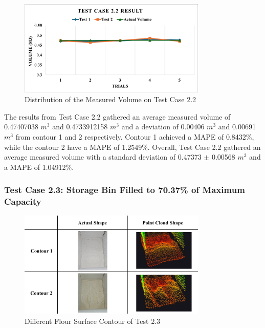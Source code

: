 \begin{figure}[H]
	\centering
	\includegraphics[width=0.8\textwidth]{Figures/test-case-2-2-graph}
	\caption{Distribution of the Measured Volume on Test Case 2.2}
	\label{ch4:fig:test-case-2-2-graph}
\end{figure}

The results from Test Case 2.2 gathered an average measured volume of 0.47407038 $m^{3}$ and 0.4733912158 $m^{3}$ and a deviation of 0.00406 $m^{3}$ and 0.00691 $m^{3}$ from contour 1 and 2 respectively. Contour 1 achieved a MAPE of 0.8432\%, while the contour 2 have a MAPE of 1.2549\%. Overall, Test Case 2.2 gathered an average measured volume with a standard deviation of 0.47373 $\pm$ 0.00568 $m^{3}$ and a MAPE of 1.04912\%.

\subsubsection*{Test Case 2.3: Storage Bin Filled to 70.37\% of Maximum Capacity}
\begin{figure}[H]
	\centering
	\includegraphics[width=0.8\textwidth]{Figures/test_2-3_contours}
	\caption{Different Flour Surface Contour of Test 2.3}
	\label{ch4:fig:test_2-3_contours}
\end{figure}

